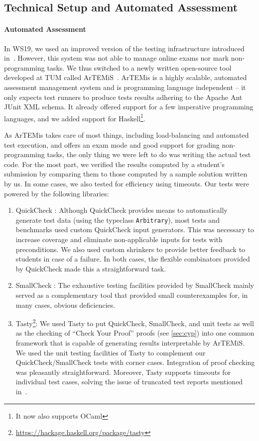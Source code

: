 \subsection{Technical Setup and Automated Assessment}\label{sec:tech_setup_test}

\paragraph{Automated Assessment}
In WS19, we used an improved version of
the testing infrastructure introduced in~\cite{next_1100}.
However, this system was not able to manage online exams nor mark non-programming tasks.
We thus switched to a newly written open-source
tool developed at TUM called ArTEMiS~\cite{artemis}.
ArTEMis is a highly scalable, automated assessment management system and is programming language independent --
it only expects test runners to produce tests results
adhering to the Apache Ant JUnit XML schema.
It already offered support for a few imperative programming languages,
and we added support for Haskell\footnote{It now also supports OCaml}.

As ArTEMis takes care of most things,
including load-balancing and automated test execution,
and offers an exam mode and good support for grading non-programming tasks,
the only thing we were left to do was writing the actual test code.
For the most part, we verified the results computed
by a student's submission by comparing them to those
computed by a sample solution written by us.
In some cases, we also tested for efficiency using timeouts.
Our tests were powered by the following libraries:
\begin{enumerate}
  \item QuickCheck \cite{quickcheck}:
  Although QuickCheck provides means to automatically generate test data (using the typeclass \lstinline!Arbitrary!),
  most tests and benchmarks used custom QuickCheck input generators.
  This was necessary to increase coverage and eliminate non-applicable inputs for tests with preconditions.
  We also used custom shrinkers to provide better feedback to students in case of a failure.
  In both cases, the flexible combinators provided by QuickCheck made this a straightforward task.
  \item SmallCheck \cite{smallcheck}: The exhaustive testing facilities provided by SmallCheck mainly served
    as a complementary tool that provided small counterexamples for, in many cases, obvious deficiencies.
  \item Tasty\footnote{\url{https://hackage.haskell.org/package/tasty}}: We used Tasty to put QuickCheck, SmallCheck, and unit tests as well as the checking of ``Check Your Proof'' proofs (see \cref{sec:cyp}) into one common framework that is capable of generating results interpretable by ArTEMiS.
  We used the unit testing facilities of Tasty to complement our QuickCheck/SmallCheck tests with corner cases.
  Integration of proof checking was pleasantly straightforward.
  Moreover, Tasty supports timeouts for individual test cases,
  solving the issue of truncated test reports mentioned in~\cite{next_1100}.
\end{enumerate}

